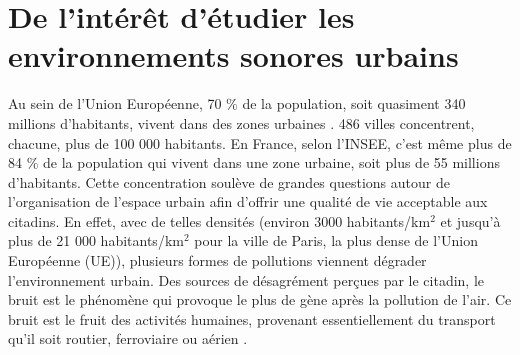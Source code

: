 \section{De l'intérêt d'étudier les environnements sonores urbains}

Au sein de l'Union Européenne, 70 $\%$ de la population, soit quasiment 340 millions d'habitants, vivent dans des zones urbaines \cite{europ-commission_data_2017}. 486 villes concentrent, chacune, plus de 100 000 habitants. En France, selon l'INSEE, c'est même plus de 84 $\%$ de la population qui vivent dans une zone urbaine, soit plus de 55 millions d'habitants. Cette concentration soulève de grandes questions autour de l'organisation de l'espace urbain afin d'offrir une qualité de vie acceptable aux citadins. En effet, avec de telles densités (environ 3000 habitants/km$^2$ et jusqu'à plus de 21 000  habitants/km$^2$ pour la ville de Paris, la plus dense de l'Union Européenne (UE)), plusieurs formes de pollutions viennent dégrader l'environnement urbain. Des sources de désagrément perçues par le citadin, le bruit est le phénomène qui provoque le plus de gène après la pollution de l'air. Ce bruit est le fruit des activités humaines, provenant essentiellement du transport qu'il soit routier, ferroviaire ou aérien \cite{zannin_characterization_2013}.\\


